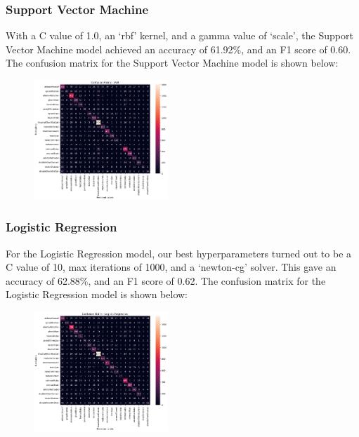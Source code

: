 \subsubsection{Support Vector Machine}
With a C value of 1.0, an `rbf' kernel, and a gamma value of `scale', the Support Vector Machine model achieved an accuracy of 61.92\%, and an F1 score of 0.60. The confusion matrix for the Support Vector Machine model is shown below:
\begin{figure}[H]
    \centering
    \includegraphics[width=0.45\textwidth]{svm_confmat.png}
\end{figure}

\subsubsection{Logistic Regression}
For the Logistic Regression model, our best hyperparameters turned out to be a C value of 10, max iterations of 1000, and a `newton-cg' solver. This gave an accuracy of 62.88\%, and an F1 score of 0.62. The confusion matrix for the Logistic Regression model is shown below:
\begin{figure}[H]
    \centering
    \includegraphics[width=0.45\textwidth]{logreg_confmat.png}
\end{figure}

